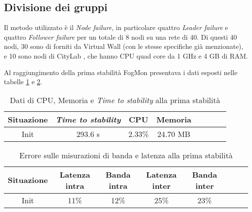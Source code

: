         \subsection{Divisione dei gruppi}
        Il metodo utilizzato è il \textit{Node failure}, in particolare quattro \textit{Leader failure} e quattro \textit{Follower failure} per un totale di 8 nodi su una rete di 40. Di questi 40 nodi, 30 sono di forniti da Virtual Wall (con le stesse specifiche già menzionate), e 10 sono nodi di CityLab \cite{clnodes}, che hanno CPU quad core da 1 GHz e 4 GB di RAM.
        
        Al raggiungimento della prima stabilità FogMon presentava i dati esposti nelle tabelle  \ref{tab:groupsplit} e \ref{tab:groupsplitqos}.
        
        \begin{table}[H]
            \begin{center}
                \caption{Dati di CPU, Memoria e \textit{Time to stability} alla prima stabilità}
                \label{tab:groupsplit}
                \begin{tabular}{|c|c|c|c|c|c|c|c|}
                    \hline
                    Situazione & \textit{Time to stability} & CPU & Memoria\\
                    \hline
                    Init & 293.6 s & 2.33\% & 24.70 MB\\
                    \hline
                \end{tabular}
            \end{center}
        \end{table}
        
        \begin{table}[H]
            \begin{center}
            \caption{Errore sulle misurazioni di banda e latenza alla prima stabilità}
                \label{tab:groupsplitqos}
                \begin{tabular}{|c|c|c|c|c|c|c|c|}
                    \hline
                    Situazione & Latenza intra & Banda intra & Latenza inter & Banda inter\\
                    \hline
                    Init & 11\% &  12\%  &  25\% &  23\%\\
                    \hline
                \end{tabular}
            \end{center}
        \end{table}
        
